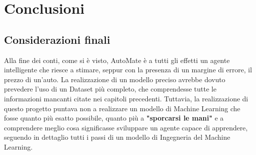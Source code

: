 \chapter{Conclusioni}

\section{Considerazioni finali}
Alla fine dei conti, come si è visto, AutoMate è a tutti gli effetti un agente intelligente che riesce a stimare, seppur con la presenza di un margine di errore, il prezzo di un'auto. La realizzazione di un modello preciso avrebbe dovuto prevedere l'uso di un Dataset più completo, che comprendesse tutte le informazioni mancanti citate nei capitoli precedenti. Tuttavia, la realizzazione di questo progetto puntava non a realizzare un modello di Machine Learning che fosse quanto più esatto possibile, quanto più a \textbf{"sporcarsi le mani"} e a comprendere meglio cosa significasse sviluppare un agente capace di apprendere, seguendo in dettaglio tutti i passi di un modello di Ingegneria del Machine Learning. 
